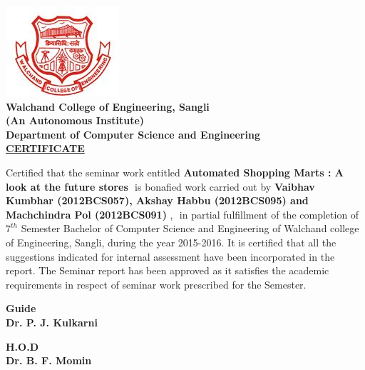 \documentclass[a4paper,oneside,11pt,english]{report}
\begin{document}
\newpage
{	
	\linespread{2}
	
	\begin{center}
		\includegraphics[width=.2\linewidth]{logo/walchand.jpg}\\[.5cm]
		\textbf{\Large Walchand College of Engineering, Sangli }\\
		\textbf {(An Autonomous Institute)}\\[.5cm]
		\textbf {\LARGE Department of Computer Science and Engineering}\\[1cm]
		{\color{blue}\huge\textbf{{\underline{CERTIFICATE}}}}\\[1cm]
	\end{center}
	\linespread{1.6}
	\par \large Certified that the seminar work entitled \textbf{Automated Shopping Marts : A look at the future stores}  ​ is bonafied work carried out by \textbf{Vaibhav Kumbhar (2012BCS057), Akshay Habbu (2012BCS095) and Machchindra Pol (2012BCS091)} , ​ in partial fulfillment of the completion of $ 7^{th} $ Semester Bachelor of Computer Science and Engineering of Walchand college of Engineering, Sangli, during the year 2015-2016. It is certified that all the suggestions indicated for internal assessment have been incorporated in the ​report. The Seminar report has been approved as it ​satisfies the academic requirements in respect of seminar work prescribed for the Semester. \\[2cm]
	\vspace{6cm}
	\begin{minipage}{.5\linewidth}
		\begin{flushleft}
			\textbf{Guide}\\
			\textbf{Dr. P. J. Kulkarni}\\
		\end{flushleft}
	\end{minipage}
	\begin{minipage}{.5\linewidth}
		\begin{flushright}
			
			\textbf{H.O.D}\\
			\textbf{Dr. B. F. Momin}\\
		\end{flushright}
	\end{minipage}
	
}
\end{document}
